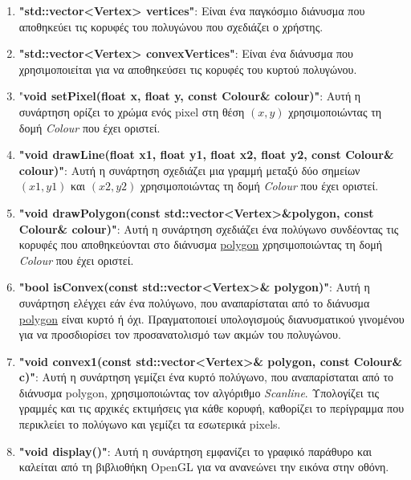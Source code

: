 \begin{enumerate}
    \item \textbf{"std::vector<Vertex> vertices"}: Είναι ένα παγκόσμιο διάνυσμα που αποθηκεύει τις κορυφές του πολυγώνου που σχεδιάζει ο χρήστης.
    \item \textbf{"std::vector<Vertex> convexVertices"}: Είναι ένα διάνυσμα που χρησιμοποιείται για να αποθηκεύσει τις κορυφές του κυρτού πολυγώνου.
    \item "\textbf{void setPixel(float x, float y, const Colour\& colour)"}: Αυτή η συνάρτηση ορίζει το χρώμα ενός pixel στη θέση $(x, y)$ χρησιμοποιώντας τη δομή \emph{Colour} που έχει οριστεί.
    \item \textbf{"void drawLine(float x1, float y1, float x2, float y2, const Colour\& colour)"}: Αυτή η συνάρτηση σχεδιάζει μια γραμμή μεταξύ δύο σημείων $(x1, y1)$ και $(x2, y2)$ χρησιμοποιώντας τη δομή \emph{Colour} που έχει οριστεί.
    \item \textbf{"void drawPolygon(const std::vector<Vertex>\&polygon, const Colour\& colour)"}: Αυτή η συνάρτηση σχεδιάζει ένα πολύγωνο συνδέοντας τις κορυφές που αποθηκεύονται στο διάνυσμα \underline{polygon} χρησιμοποιώντας τη δομή \emph{Colour} που έχει οριστεί.
    \item \textbf{"bool isConvex(const std::vector<Vertex>\& polygon)"}: Αυτή η συνάρτηση ελέγχει εάν ένα πολύγωνο, που αναπαρίσταται από το διάνυσμα \underline{polygon} είναι κυρτό ή όχι. Πραγματοποιεί υπολογισμούς διανυσματικού γινομένου για να προσδιορίσει τον προσανατολισμό των ακμών του πολυγώνου.
    \item \textbf{"void convex1(const std::vector<Vertex>\& polygon, const Colour\& c)"}: Αυτή η συνάρτηση γεμίζει ένα κυρτό πολύγωνο, που αναπαρίσταται από το διάνυσμα polygon, χρησιμοποιώντας τον αλγόριθμο \emph{Scanline}. Υπολογίζει τις γραμμές και τις αρχικές εκτιμήσεις για κάθε κορυφή, καθορίζει το περίγραμμα που περικλείει το πολύγωνο και γεμίζει τα εσωτερικά pixels.
    \item \textbf{"void display()"}: Αυτή η συνάρτηση εμφανίζει το γραφικό παράθυρο και καλείται από τη βιβλιοθήκη OpenGL για να ανανεώνει την εικόνα στην οθόνη.
\end{enumerate}
\par
\clearpage



